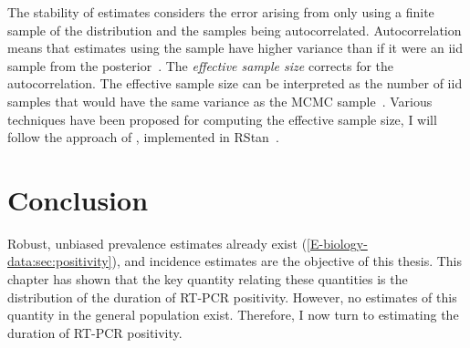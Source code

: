 \documentclass[thesis.tex]{subfiles}
\begin{document}
The stability of estimates considers the error arising from only using a finite sample of the distribution and the samples being autocorrelated.
Autocorrelation means that estimates using the sample have higher variance than if it were an iid sample from the posterior~\autocite[286]{gelmanBDA}.
The \emph{effective sample size} corrects for the autocorrelation.
The effective sample size can be interpreted as the number of iid samples that would have the same variance as the MCMC sample~\autocites[286]{gelmanBDA}{vehtariRhat}.
Various techniques have been proposed for computing the effective sample size, I will follow the approach of \textcite{vehtariRhat}, implemented in RStan~\autocite{RStan-2-32-3}.

\section{Conclusion} \label{inc-prev:sec:conclusion}

Robust, unbiased prevalence estimates already exist (\cref{E-biology-data:sec:positivity}), and incidence estimates are the objective of this thesis.
This chapter has shown that the key quantity relating these quantities is the distribution of the duration of RT-PCR positivity.
However, no estimates of this quantity in the general population exist.
Therefore, I now turn to estimating the duration of RT-PCR positivity.

\ifSubfilesClassLoaded{
  \listoftodos
}{}
\end{document}

